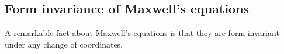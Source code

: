 \subsection{Form invariance of Maxwell's equations}
A remarkable fact about Maxwell's equations is that they are form invariant
under any change of coordinates.

